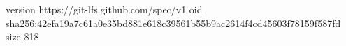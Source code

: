 version https://git-lfs.github.com/spec/v1
oid sha256:42efa19a7c61a0e35bd881e618c39561b55b9ac2614f4cd45603f78159f587fd
size 818
